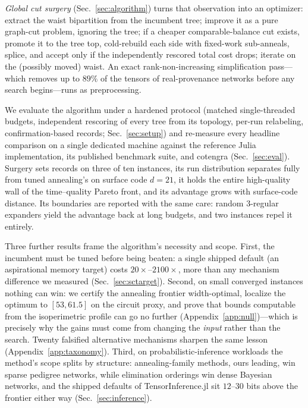 \documentclass{SciPost}
\begin{document}
\emph{Global cut surgery} (Sec.~\ref{sec:algorithm}) turns that
observation into an optimizer: extract the waist bipartition from the
incumbent tree; improve it as a pure graph-cut problem, ignoring the
tree; if a cheaper comparable-balance cut exists, promote it to the tree
top, cold-rebuild each side with fixed-work sub-anneals, splice, and
accept only if the independently rescored total cost drops; iterate on
the (possibly moved) waist. An exact rank-non-increasing simplification
pass---which removes up to $89\%$ of the tensors of real-provenance
networks before any search begins---runs as preprocessing.

We evaluate the algorithm under a hardened protocol (matched
single-threaded budgets, independent rescoring of every tree from its
topology, per-run relabeling, confirmation-based records;
Sec.~\ref{sec:setup}) and re-measure every headline comparison on a
single dedicated machine against the reference Julia implementation, its
published benchmark suite, and cotengra (Sec.~\ref{sec:eval}). Surgery
sets records on three of ten instances, its run distribution separates
fully from tuned annealing's on surface code $d{=}21$, it holds the
entire high-quality wall of the time--quality Pareto front, and its
advantage grows with surface-code distance. Its boundaries are reported
with the same care: random 3-regular expanders yield the advantage back
at long budgets, and two instances repel it entirely.

Three further results frame the algorithm's necessity and scope. First,
the incumbent must be tuned before being beaten: a single shipped
default (an aspirational memory target) costs $20\times$--$2100\times$,
more than any mechanism difference we measured
(Sec.~\ref{sec:sctarget}). Second, on small converged instances nothing
can win: we certify the annealing frontier width-optimal, localize the
optimum to $[53, 61.5]$ on the circuit proxy, and prove that bounds
computable from the isoperimetric profile can go no further
(Appendix~\ref{app:null})---which is precisely why the gains must come from
changing the \emph{input} rather than the search. Twenty falsified
alternative mechanisms sharpen the same lesson (Appendix~\ref{app:taxonomy}).
Third, on probabilistic-inference workloads the method's scope splits by
structure: annealing-family methods, ours leading, win sparse pedigree
networks, while elimination orderings win dense Bayesian networks, and
the shipped defaults of TensorInference.jl sit $12$--$30$ bits above the
frontier either way (Sec.~\ref{sec:inference}).
\end{document}
